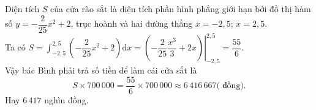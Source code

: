 \begin{ex}
{		Diện tích $S$ của cửa rào sắt là diện tích phần hình phẳng giới hạn bởi đồ thị hàm số $y=-\dfrac{2}{25} x^{2}+2$, trục hoành và hai đường thẳng $x=-2{,}5$; $x=2{,}5$.\\
		Ta có $S=\displaystyle\int_{-2{,}5}^{2{,}5}\left(-\dfrac{2}{25} x^{2}+2\right) \mathrm{d} x=\left.\left(-\dfrac{2}{25} \dfrac{x^{3}}{3}+2 x\right)\right|_{-2{,}5} ^{2{,}5}=\dfrac{55}{6}$.\\
		Vậy bác Bình phải trả số tiền để làm cái cửa sắt là
		$$S \times 700\,000=\dfrac{55}{6} \times 700\,000 \approx 6\,416 \,667 \text{( đồng).}$$ 
		Hay $6\,417$ nghìn đồng.
	}
\end{ex}

